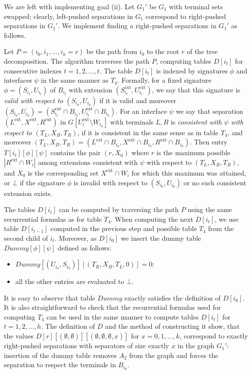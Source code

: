 \documentclass[a4paper,11pt]{article}
\theoremstyle{definition}
\theoremstyle{remark}
\newcommand{\ext}{\textrm{ext}}
\begin{document}
We are left with implementing goal (ii).  Let $G_1'$ be $G_1$ with
terminal sets swapped; clearly, left-pushed separations in $G_1$
correspond to right-pushed separations in $G_1'$.  We implement
finding a right-pushed separations in $G_1'$ as follows.

Let $P=(i_0,i_1,\ldots,i_h=r)$ be the path from $i_0$ to the root $r$
of the tree decomposition.  The algorithm traverses the path $P$,
computing tables $D[i_t]$ for consecutive indexes $t=1,2,\ldots,t$.
The table $D[i_t]$ is indexed by signatures $\phi$ and interfaces $\psi$
in the same manner as $T_4$.  Formally, for a fixed signature
$\phi=(S_{i_t},U_{i_t})$ of $B_{i_t}$ with extension
$(S^{\ext}_{i_t},U^{\ext}_{i_t})$, we say that this signature is
{\emph{valid with respect to $(S_{i_0},U_{i_0})$}} if it is valid and
moreover $(S_{i_0},U_{i_0})=(S^{\ext}_{i_t}\cap
B_{i_0},U^{\ext}_{i_t}\cap B_{i_0})$.  For an interface $\psi$ we say
that separation $(L^{\ext}, X^{\ext}, R^{\ext})$ in
$G[U^{\ext}_i\setminus W_{i_0}]$ with terminals $L,R$ is
{\emph{consistent with $\psi$ with respect to $(T_L,X_B,T_R)$}}, if it
is consistent in the same sense as in table $T_4$, and moreover
$(T_L,X_B,T_R)=(L^{\ext}\cap B_{i_0}, X^{\ext}\cap B_{i_0},
R^{\ext}\cap B_{i_0})$.  Then entry $T[i_t][\phi][\psi]$ contains the
pair $(r,X_0)$ where $r$ is the maximum possible $|R^{\ext}\cap W_i|$
among extensions consistent with $\psi$ with respect to
$(T_L,X_B,T_R)$, and $X_0$ is the corresponding set $X^{\ext}\cap W_i$
for which this maximum was attained, or $\bot$ if the signature $\phi$
is invalid with respect to $(S_{i_0},U_{i_0})$ or no such consistent
extension exists.

The tables $D[i_t]$ can be computed by traversing the path $P$ using the
same recurrential formulas as for table $T_4$.  When computing the
next $D[i_t]$, we use table $D[i_{t-1}]$ computed in the previous step
and possible table $T_4$ from the second child of $i_t$.  Moreover, as
$D[i_0]$ we insert the dummy table $Dummy[\phi][\psi]$ defined as follows:
\begin{itemize}
\item $Dummy[(U_{i_0},S_{i_0})][(T_R,X_B,T_L,0)]=0$;
\item all the other entries are evaluated to $\bot$.
\end{itemize}
It is easy to observe that table $Dummy$ exactly satisfies the
definition of $D[i_0]$.  It is also straightforward to check that the
recurrential formulas used for computing $T_4$ can be used in the same
manner to compute tables $D[i_t]$ for $t=1,2,\ldots,h$.  The
definition of $D$ and the method of constructing it show, that the
values
$D[r][(\emptyset,\emptyset)][(\emptyset,\emptyset,\emptyset,x)]$ for
$x=0,1,\ldots,k$, correspond to exactly right-pushed separations with
separators of size exactly $x$ in the graph $G_1'$: insertion of the
dummy table removes $A_2$ from the graph and forces the separation to
respect the terminals in $B_{i_0}$.
\end{document}

